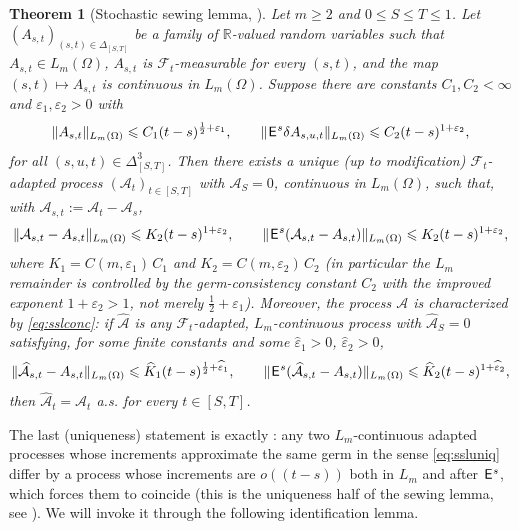 \documentclass[12pt]{article}
\newtheorem{theorem}{Theorem}
\theoremstyle{definition}
\DeclareMathOperator{\1}{\mathbbm{1}}%
\def\E{\hskip.15ex\mathsf{E}\hskip.10ex}
\renewcommand{\ge}{\geqslant}
\renewcommand{\le}{\leqslant}
\newcommand{\F}{\mathcal{F}}
\newcommand{\R}{\mathbb{R}}
\begin{document}
\begin{theorem}[Stochastic sewing lemma, {\cite[Theorem~2.1]{LeSSL}}]\label{T:ssl}
Let $m\ge2$ and $0\le S\le T\le1$. Let $(A_{s,t})_{(s,t)\in\Delta_{[S,T]}}$ be a family
of $\R$-valued random variables such that $A_{s,t}\in L_m(\Omega)$, $A_{s,t}$ is
$\F_t$-measurable for every $(s,t)$, and the map $(s,t)\mapsto A_{s,t}$ is continuous
in $L_m(\Omega)$. Suppose there are constants $C_1,C_2<\infty$ and
$\varepsilon_1,\varepsilon_2>0$ with
\begin{equation}\label{eq:sslhyp}
\|A_{s,t}\|_{L_m(\Omega)}\le C_1(t-s)^{\frac12+\varepsilon_1},
\qquad
\|\E^s\delta A_{s,u,t}\|_{L_m(\Omega)}\le C_2(t-s)^{1+\varepsilon_2},
\end{equation}
for all $(s,u,t)\in\Delta^3_{[S,T]}$. Then there exists a unique (up to
modification) $\F_t$-adapted process $(\mathcal A_t)_{t\in[S,T]}$ with $\mathcal A_S=0$,
continuous in $L_m(\Omega)$, such that, with $\mathcal A_{s,t}:=\mathcal A_t-\mathcal A_s$,
\begin{equation}\label{eq:sslconc}
\|\mathcal A_{s,t}-A_{s,t}\|_{L_m(\Omega)}\le K_2(t-s)^{1+\varepsilon_2},
\qquad
\|\E^s(\mathcal A_{s,t}-A_{s,t})\|_{L_m(\Omega)}\le K_2(t-s)^{1+\varepsilon_2},
\end{equation}
where $K_1=C(m,\varepsilon_1)\,C_1$ and $K_2=C(m,\varepsilon_2)\,C_2$ (in particular the
$L_m$ remainder is controlled by the \emph{germ-consistency} constant $C_2$ with the
\emph{improved} exponent $1+\varepsilon_2>1$, not merely $\tfrac12+\varepsilon_1$).
Moreover, the
process $\mathcal A$ is characterized by \eqref{eq:sslconc}: if $\widehat{\mathcal A}$ is any
$\F_t$-adapted, $L_m$-continuous process with $\widehat{\mathcal A}_S=0$ satisfying, for some
finite constants and some $\widehat\varepsilon_1>0$, $\widehat\varepsilon_2>0$,
\begin{equation}\label{eq:ssluniq}
\|\widehat{\mathcal A}_{s,t}-A_{s,t}\|_{L_m(\Omega)}\le \widehat K_1(t-s)^{\frac12+\widehat\varepsilon_1},
\qquad
\|\E^s(\widehat{\mathcal A}_{s,t}-A_{s,t})\|_{L_m(\Omega)}\le \widehat K_2(t-s)^{1+\widehat\varepsilon_2},
\end{equation}
then $\widehat{\mathcal A}_t=\mathcal A_t$ a.s. for every $t\in[S,T]$.
\end{theorem}

The last (uniqueness) statement is exactly \cite[Theorem~2.1]{LeSSL}: any two
$L_m$-continuous adapted processes whose increments approximate the same germ in the
sense \eqref{eq:ssluniq} differ by a process whose increments are
$o((t-s))$ both in $L_m$ and after $\E^s$, which forces them to coincide (this is the
uniqueness half of the sewing lemma, see \cite[Theorem~2.1, eqs.~(2.3)--(2.4) and the
following remark]{LeSSL}). We will invoke it through the following identification lemma.
\end{document}
